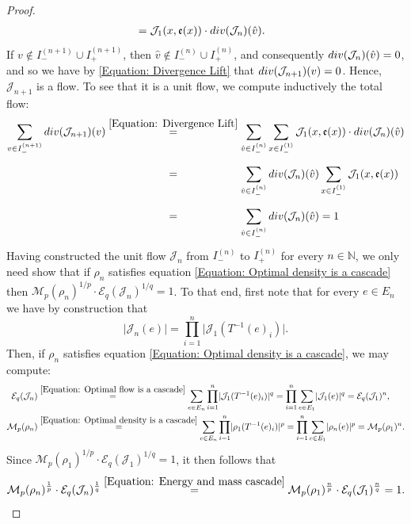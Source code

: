 \documentclass[10pt,a4paper]{amsart}
\newcommand{\N}{\mathbb{N}}
\newcommand{\cE}{\mathcal{E}}
\newcommand{\cJ}{\mathcal{J}}
\newcommand{\cM}{\mathcal{M}}
\newcommand{\divr}{{\rm div}}
\begin{document}
\begin{proof}
\begin{equation}
\begin{split}
        &=\cJ_1(x,\mathfrak{e}(x))\cdot\divr(\cJ_n)(\hat{v}).
    \end{split}
    \end{equation}
    If \(v\not\in I_-^{(n+1)}\cup I_+^{(n+1)}\), then \(\hat{v}\not\in I_-^{(n)}\cup I_+^{(n)}\), and consequently \(\divr(\cJ_n)(\hat{v})=0\), and so we have by \eqref{Equation: Divergence Lift} that \(\divr(\cJ_{n+1})(v)=0\). Hence, \(\cJ_{n+1}\) is a flow. To see that it is a unit flow, we compute inductively the total flow:
    \[
    \begin{split}
        \sum_{v\in I_-^{(n+1)}}\divr(\cJ_{n+1})(v)&\stackrel{\eqref{Equation: Divergence Lift}}{=}\sum_{\hat{v}\in I_-^{(n)}}\sum_{x\in I_-^{(1)}}\cJ_1(x,\mathfrak{e}(x))\cdot \divr(\cJ_n)(\hat{v})\\
        &\stackrel{\phantom{\eqref{Equation: Divergence Lift}}}{=}\sum_{\hat{v}\in I_-^{(n)}}\divr(\cJ_n)(\hat{v})\sum_{x\in I_-^{(1)}}\cJ_1(x,\mathfrak{e}(x))\\
        &\stackrel{\phantom{\eqref{Equation: Divergence Lift}}}{=}\sum_{\hat{v}\in I_-^{(n)}}\divr(\cJ_n)(\hat{v})=1
    \end{split}
    \]
    Having constructed the unit flow \(\cJ_n\) from \(I^{(n)}_-\) to \(I^{(n)}_+\) for every \(n\in\N\), we only need show that if \(\rho_n\) satisfies equation \eqref{Equation: Optimal density is a cascade} then \(\cM_p(\rho_n)^{1/p} \cdot \cE_q(\cJ_n)^{1/q}=1\). To that end, first note that for every \(e\in E_{n}\) we have by construction that
    \begin{equation}\label{Equation: Optimal flow is a cascade}
        \lvert \cJ_{n}(e)\rvert=\prod_{i=1}^{n}\lvert \cJ_1(T^{-1}(e)_i)\rvert.
    \end{equation}
    Then, if \(\rho_n\) satisfies equation \eqref{Equation: Optimal density is a cascade}, we may compute:
    \begin{equation}\label{Equation: Energy and mass cascade}
    \begin{split}
        \cE_q(\cJ_n)&\stackrel{\eqref{Equation: Optimal flow is a cascade}}{=}\sum_{e\in E_n}\prod_{i=1}^{n}\lvert \cJ_1(T^{-1}(e)_i)\rvert^q=\prod_{i=1}^{n}\sum_{e\in E_1}\lvert\cJ_1(e)\rvert^q=\cE_q(\cJ_1)^n,\\
        \cM_p(\rho_n)&\stackrel{\eqref{Equation: Optimal density is a cascade}}{=}\sum_{e\in E_n}\prod_{i=1}^n\lvert \rho_1(T^{-1}(e)_i)\rvert^p=\prod_{i=1}^n\sum_{e\in E_1}\lvert\rho_n(e)\rvert^p=\cM_p(\rho_1)^n.
    \end{split}
    \end{equation}
    Since \(\cM_p(\rho_1)^{1/p} \cdot \cE_q(\cJ_1)^{1/q}=1\), it then follows that
    \[
        \cM_p(\rho_n)^\frac{1}{p}\cdot \cE_q(\cJ_n)^\frac{1}{q}\stackrel{\eqref{Equation: Energy and mass cascade}}{=}\cM_p(\rho_1)^\frac{n}{p}\cdot \cE_q(\cJ_1)^\frac{n}{q}=1.
    \]  
\end{proof}
\end{document}
